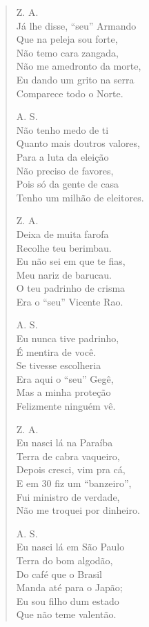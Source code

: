 \begin{verse}
Z. A.\\
Já lhe disse, “seu” Armando\\
Que na peleja sou forte,\\
Não temo cara zangada,\\
Não me amedronto da morte,\\
Eu dando um grito na serra\\
Comparece todo o Norte.

A. S.\\
Não tenho medo de ti\\
Quanto mais doutros valores,\\
Para a luta da eleição\\
Não preciso de favores,\\
Pois só da gente de casa\\
Tenho um milhão de eleitores.

Z. A.\\
Deixa de muita farofa\\
Recolhe teu berimbau.\\
Eu não sei em que te fias,\\
Meu nariz de barucau.\\
O teu padrinho de crisma\\
Era o “seu” Vicente Rao.

A. S.\\
Eu nunca tive padrinho,\\
É mentira de você.\\
Se tivesse escolheria\\
Era aqui o “seu” Gegê,\\
Mas a minha proteção\\
Felizmente ninguém vê.
\pagebreak

Z. A.\\
Eu nasci lá na Paraíba\\
Terra de cabra vaqueiro,\\
Depois cresci, vim pra cá,\\
E em 30 fiz um “banzeiro”,\\
Fui ministro de verdade,\\
Não me troquei por dinheiro.

A. S.\\
Eu nasci lá em São Paulo\\
Terra do bom algodão,\\
Do café que o Brasil\\
Manda até para o Japão; \\
Eu sou filho dum estado\\
Que não teme valentão.


\end{verse}

